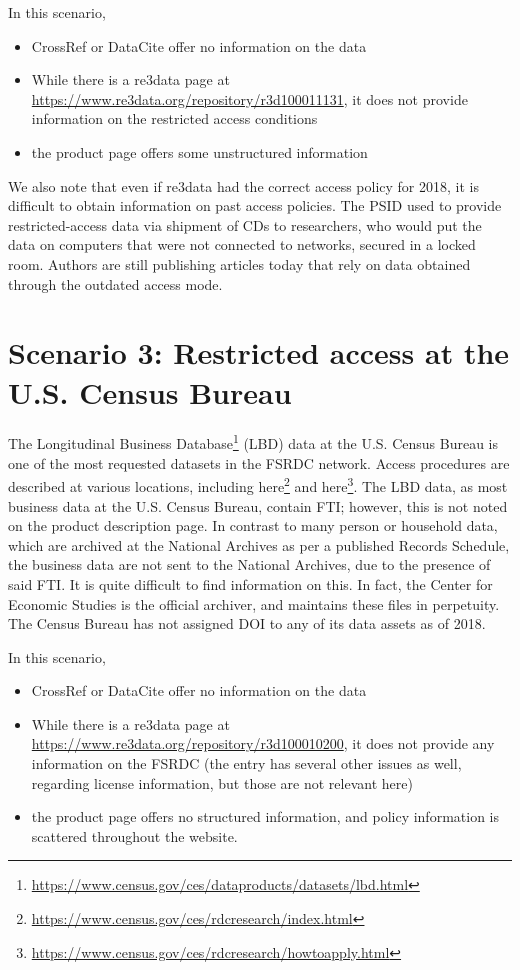 \documentclass[10pt,letterpaper]{article}
\newcommand{\urlcite}[2]{#2\footnote{\url{#1}}}
\begin{document}
In this scenario, 
\begin{itemize}
	\item CrossRef or DataCite offer no information on the data
	\item While there is a re3data page at \url{https://www.re3data.org/repository/r3d100011131}, it does not provide information on the restricted access conditions
	\item the product page offers some unstructured information
\end{itemize}
We also note that even if re3data had the correct access policy for 2018, it is difficult to obtain information on past access policies. The \ac{PSID} used to provide restricted-access data via shipment of CDs to researchers, who would put the data on computers that were not connected to networks, secured in a locked room. Authors are still publishing articles today that rely on data obtained through the outdated access mode. 

\section{Scenario 3: Restricted access at the U.S. Census Bureau}

The \urlcite{https://www.census.gov/ces/dataproducts/datasets/lbd.html}{Longitudinal Business Database} (LBD) data at the U.S. Census Bureau is one of the most requested datasets in the \ac{FSRDC} network. Access procedures are described at various locations, including \urlcite{https://www.census.gov/ces/rdcresearch/index.html}{here} and \urlcite{https://www.census.gov/ces/rdcresearch/howtoapply.html}{here}. The LBD data, as most business data at the U.S. Census Bureau, contain \ac{FTI}; however, this is not noted on the product description page. In contrast to many person or household data, which are archived at the National Archives as per a published Records Schedule, the business data are not sent to the National Archives, due to the presence of said \ac{FTI}. It is quite difficult to find information on this. In fact, the Center for Economic Studies is the official archiver, and maintains these files in perpetuity. The Census Bureau has not assigned \ac{DOI} to any of its data assets as of 2018.


In this scenario, 
\begin{itemize}
	\item CrossRef or DataCite offer no information on the data
	\item While there is a re3data page at \url{https://www.re3data.org/repository/r3d100010200}, it does not provide any information on the \ac{FSRDC} (the entry has several other issues as well, regarding license information, but those are not relevant here)
	\item the product page offers no structured information, and policy information is scattered throughout the website.
\end{itemize}

%
%
\printbibliography[title=References Cited]
\end{document}

